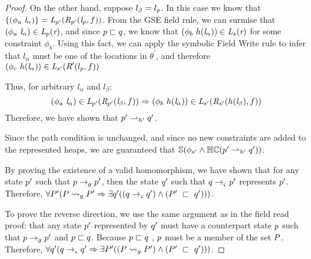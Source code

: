 \begin{proof}
On the other hand, suppose $l_\beta = l_{p}$. In this case we know that $\{(\phi_a\ \emph{l}_\alpha)\} = \emph{L}_{p^\prime}(\emph{R}_{p^\prime}(\emph{l}_{p},f ))$. From the GSE field rule, we can surmise that $(\phi_a\ \emph{l}_\alpha) \in \emph{L}_{p}(\emph{r} )$, and since $p \sqsubset q$, we know that $(\phi_b\ h(\emph{l}_\alpha)) \in \emph{L}_{s}(\emph{r})$ for some constraint $\phi_b$. Using this fact, we can apply the symbolic Field Write rule to infer that $l_\alpha$ must be one of the locations in $\theta^\prime$, and therefore $(\phi_c\ h(\emph{l}_\alpha)) \in \emph{L}_{s^\prime}(\emph{R}^\prime(l_{p},f))$

Thus, for arbitrary $l_\alpha$ and $l_\beta$:
$$(\phi_a\ \emph{l}_\alpha) \in \emph{L}_{p^\prime}(\emph{R}_{p^\prime}(\emph{l}_\beta,f )) \Rightarrow (\phi_b\ h(\emph{l}_\alpha))\in \emph{L}_{s^\prime}(\emph{R}_{s^\prime} (h(\emph{l}_\beta),f ))$$
Therefore, we have shown that $p^\prime \rightharpoonup_{h^\prime} q^\prime$.

Since the path condition is unchanged, and since no new constraints are added to the represented heaps, we are guaranteed that $\mathbb{S}(\phi_{s^\prime} \wedge \mathbb{HC}(p^\prime \rightharpoonup_{h^\prime} q^\prime) )$.

By proving the existence of a valid homomorphism, we have shown that for any state $p^\prime$ such that $p \rightarrow_{g} p^\prime$, then the state $q^\prime$ such that $q \rightarrow_{\varsigma} p^\prime$ represents $p^\prime$. Therefore, $\forall P^\prime ( P \leadsto_{g} P^\prime \Rightarrow \exists q^\prime( (q \rightarrow_{\varsigma} q^\prime )\wedge (P^\prime\ \sqsubset\ q^\prime ))  )$.

To prove the reverse direction, we use the same argument as in the field read proof: that any state $p^\prime$ represented by $q^\prime$ must have a counterpart state $p$ such that $p \rightarrow_{g} p^\prime$ and $p \sqsubset q$. Because $p \sqsubset q$ , $p$ must be a member of the set $P$. Therefore, $\forall q^\prime ( q \rightarrow_{\varsigma} q^\prime\Rightarrow \exists P^\prime( (P \leadsto_{g} P^\prime )\wedge (P^\prime\ \sqsubset\ q^\prime ))  )$.

\end{proof}


